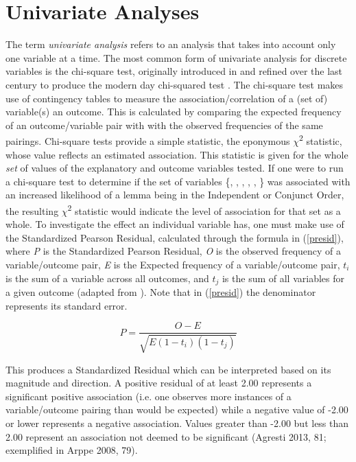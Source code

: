 \section{Univariate Analyses}
The term \textit{univariate analysis} refers to an analysis that takes into account only one variable at a time.  The most common form of univariate analysis for discrete variables is the chi-square test, originally introduced in \citet{pearson1900x} and refined over the last century to produce the modern day chi-squared test \citep{agresti2013categorical}. The chi-square test makes use of contingency tables to measure the association/correlation of a (set of) variable(s) an outcome. This is calculated by comparing the expected frequency of an outcome/variable pair with with the observed frequencies of the same pairings. Chi-square tests provide a simple statistic, the eponymous $\chi$\textsuperscript{2} statistic, whose value reflects an estimated association. This statistic is given for the whole \textit{set} of values of the explanatory and outcome variables tested. If one were to run a chi-square test to determine if the set of variables \{, , , , , \} was associated with an increased likelihood of a lemma being in the Independent or Conjunct Order, the resulting $\chi$\textsuperscript{2} statistic would indicate the level of association for that set as a whole. To investigate the effect an individual variable has, one must make use of the Standardized Pearson Residual, calculated through the formula in (\ref{presid}), where \textit{P} is the Standardized Pearson Residual, \textit{O} is the observed frequency of a variable/outcome pair, \textit{E} is the Expected frequency of a variable/outcome pair, $t_{i}$ is the sum of a variable across all outcomes, and $t_{j}$ is the sum of all variables for a given outcome  (adapted from \citep[81]{agresti2013categorical}). Note that in (\ref{presid}) the denominator represents its standard error.

\begin{equation}
P = \frac{O - E}{\sqrt{E(1-t_{i})(1-t_{j})}}
\label{presid}
\end{equation}

This produces a Standardized Residual which can be interpreted based on its magnitude and direction. A positive residual of at least 2.00 represents a significant positive association (i.e. one observes more instances of a variable/outcome pairing than would be expected) while a negative value of -2.00 or lower represents a negative association. Values greater than -2.00 but less than 2.00 represent an association not deemed to be significant (Agresti 2013, 81; exemplified in Arppe 2008, 79). 

